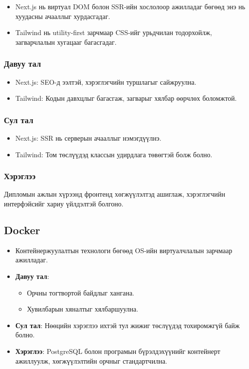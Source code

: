 \begin{itemize}
    \item Next.js нь виртуал DOM болон SSR-ийн хослолоор ажилладаг бөгөөд энэ нь хуудасны ачааллыг хурдасгадаг.
    \item Tailwind нь utility-first зарчмаар CSS-ийг урьдчилан тодорхойлж, загварчлалын хугацааг багасгадаг.
\end{itemize}

\subsubsection{Давуу тал}
\begin{itemize}
    \item Next.js: SEO-д ээлтэй, хэрэглэгчийн туршлагыг сайжруулна.
    \item Tailwind: Кодын давхцлыг багасгаж, загварыг хялбар өөрчлөх боломжтой.
\end{itemize}

\subsubsection{Сул тал}
\begin{itemize}
    \item Next.js: SSR нь серверын ачааллыг нэмэгдүүлнэ.
    \item Tailwind: Том төслүүдэд классын удирдлага төвөгтэй болж болно.
\end{itemize}

\subsubsection{Хэрэглээ}
Дипломын ажлын хүрээнд фронтенд хөгжүүлэлтэд ашиглаж, хэрэглэгчийн интерфэйсийг хариу үйлдэлтэй болгоно.

\subsection{Docker}
\begin{itemize}
    \item Контейнержуулалтын технологи бөгөөд OS-ийн виртуалчлалын зарчмаар ажилладаг.
    \item \textbf{Давуу тал}: 
    \begin{itemize}
        \item Орчны тогтвортой байдлыг хангана.
        \item Хувилбарын хяналтыг хялбаршуулна.
    \end{itemize}
    \item \textbf{Сул тал}: Нөөцийн хэрэглээ ихтэй тул жижиг төслүүдэд тохиромжгүй байж болно.
    \item \textbf{Хэрэглээ}: PostgreSQL болон програмын бүрэлдэхүүнийг контейнерт ажиллуулж, 
    хөгжүүлэлтийн орчныг стандартчилна.
\end{itemize}

